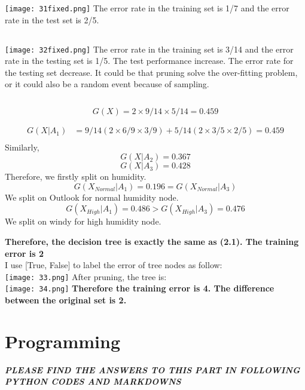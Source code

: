 \documentclass{article}
\begin{document}
\texttt{[image: 31fixed.png]}
The error rate in the training set is 1/7 and the error rate in the test set is 2/5.

\subsection{}
\texttt{[image: 32fixed.png]}
The error rate in the training set is 3/14 and the error rate in the testing set is 1/5. The test performance increase. The error rate for the testing set decrease. It could be that pruning solve the over-fitting problem, or it could also be a random event because of sampling. 

\subsection{}
\begin{equation}
    G(X) = 2 \times 9/14 \times 5/14 = 0.459
\end{equation}

\begin{equation}
\begin{split}
    G(X | A_1) &= 9/14 (2 \times 6/9 \times 3/9) + 5/14 (2 \times 3/5 \times 2/5) = 0.459\\
\end{split}
\end{equation}
Similarly,
$$G(X | A_2) = 0.367$$
$$G(X | A_3) = 0.428$$
Therefore, we firstly split on humidity.
$$G(X_{Normal} | A_1) = 0.196 = G(X_{Normal} | A_3)$$
We split on Outlook for normal humidity node.
$$G(X_{High} | A_1) = 0.486 > G(X_{High} | A_3) = 0.476$$
We split on windy for high humidity node.

\textbf{Therefore, the decision tree is exactly the same as (2.1). The training error is 2}\\

I use [True, False] to label the error of tree nodes as follow:\\
\texttt{[image: 33.png]}
After pruning, the tree is:\\
\texttt{[image: 34.png]}
\textbf{Therefore the training error is 4. The difference between the original set is 2.}

\section{Programming}
\textbf{\textit{PLEASE FIND THE ANSWERS TO THIS PART IN FOLLOWING PYTHON CODES AND MARKDOWNS}}
\end{document}
